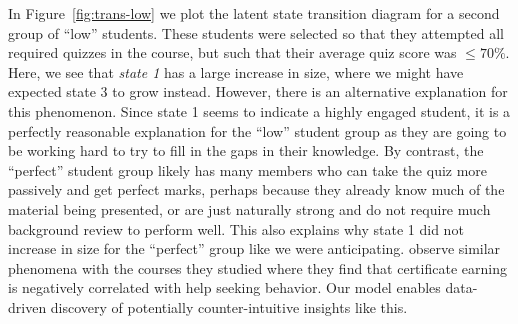 In Figure~\ref{fig:trans-low} we plot the latent state transition diagram
for a second group of ``low'' students. These students were selected so
that they attempted all required quizzes in the course, but such that their
average quiz score was $\leq 70\%$. Here, we see that \emph{state 1} has a
large increase in size, where we might have expected state 3 to grow
instead.  However, there is an alternative explanation for this phenomenon.
Since state 1 seems to indicate a highly engaged student, it is a perfectly
reasonable explanation for the ``low'' student group as they are going to
be working hard to try to fill in the gaps in their knowledge. By contrast,
the ``perfect'' student group likely has many members who can take the quiz
more passively and get perfect marks, perhaps because they already know
much of the material being presented, or are just naturally strong and do
not require much background review to perform well. This also explains why
state 1 did not increase in size for the ``perfect'' group like we were
anticipating. \citet{Kizilcec:2017:CandE} observe similar phenomena with
the courses they studied where they find that certificate earning is
negatively correlated with help seeking behavior. Our model enables
data-driven discovery of potentially counter-intuitive insights like this.

